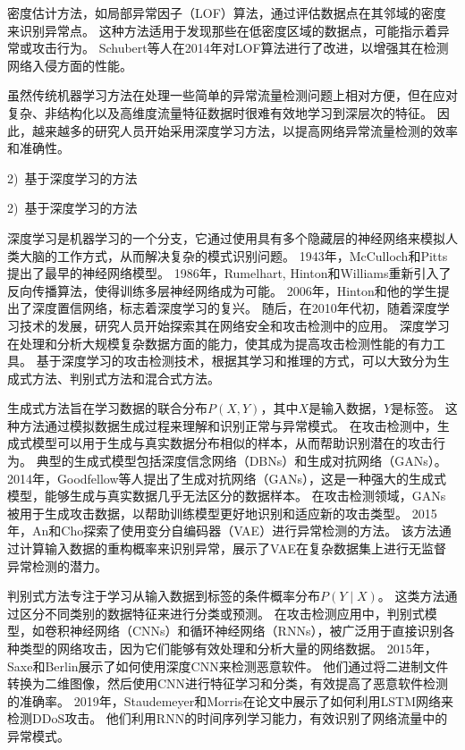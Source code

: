 密度估计方法，如局部异常因子（LOF）算法，通过评估数据点在其邻域的密度来识别异常点。
这种方法适用于发现那些在低密度区域的数据点，可能指示着异常或攻击行为。
Schubert等人\cite{schubert2014local}在2014年对LOF算法进行了改进，以增强其在检测网络入侵方面的性能。

虽然传统机器学习方法在处理一些简单的异常流量检测问题上相对方便，但在应对复杂、非结构化以及高维度流量特征数据时很难有效地学习到深层次的特征。
因此，越来越多的研究人员开始采用深度学习方法，以提高网络异常流量检测的效率和准确性。\par

2)~基于深度学习的方法\par
2)~基于深度学习的方法\par
深度学习是机器学习的一个分支，它通过使用具有多个隐藏层的神经网络来模拟人类大脑的工作方式，从而解决复杂的模式识别问题。
1943年，McCulloch和Pitts提出了最早的神经网络模型。
1986年，Rumelhart, Hinton和Williams重新引入了反向传播算法，使得训练多层神经网络成为可能。
2006年，Hinton和他的学生提出了深度置信网络，标志着深度学习的复兴。
随后，在2010年代初，随着深度学习技术的发展，研究人员开始探索其在网络安全和攻击检测中的应用。
深度学习在处理和分析大规模复杂数据方面的能力，使其成为提高攻击检测性能的有力工具。
基于深度学习的攻击检测技术，根据其学习和推理的方式，可以大致分为生成式方法、判别式方法和混合式方法。

生成式方法旨在学习数据的联合分布$P(X,Y)$，其中$X$是输入数据，$Y$是标签。
这种方法通过模拟数据生成过程来理解和识别正常与异常模式。
在攻击检测中，生成式模型可以用于生成与真实数据分布相似的样本，从而帮助识别潜在的攻击行为。
典型的生成式模型包括深度信念网络（DBNs）和生成对抗网络（GANs）。
2014年，Goodfellow等人提出了生成对抗网络（GANs）\cite{goodfellow2014generative}，这是一种强大的生成式模型，能够生成与真实数据几乎无法区分的数据样本。
在攻击检测领域，GANs被用于生成攻击数据，以帮助训练模型更好地识别和适应新的攻击类型。
2015年，An和Cho探索了使用变分自编码器（VAE）进行异常检测的方法\cite{an2015variational}。
该方法通过计算输入数据的重构概率来识别异常，展示了VAE在复杂数据集上进行无监督异常检测的潜力。

判别式方法专注于学习从输入数据到标签的条件概率分布$P(Y∣X)$。
这类方法通过区分不同类别的数据特征来进行分类或预测。
在攻击检测应用中，判别式模型，如卷积神经网络（CNNs）和循环神经网络（RNNs），被广泛用于直接识别各种类型的网络攻击，因为它们能够有效处理和分析大量的网络数据。
2015年，Saxe和Berlin展示了如何使用深度CNN来检测恶意软件\cite{saxe2015deep}。
他们通过将二进制文件转换为二维图像，然后使用CNN进行特征学习和分类，有效提高了恶意软件检测的准确率。
2019年，Staudemeyer和Morris\cite{staudemeyer2019applying}在论文中展示了如何利用LSTM网络来检测DDoS攻击。
他们利用RNN的时间序列学习能力，有效识别了网络流量中的异常模式。

